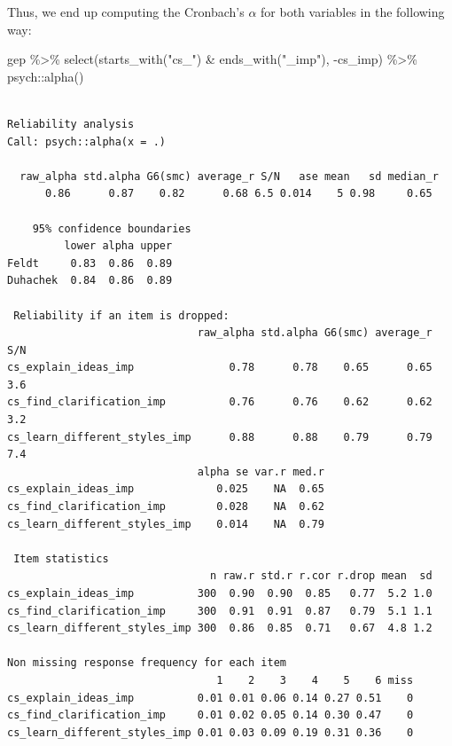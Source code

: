 \documentclass[
  letterpaper,
]{krantz}
\makeatletter
\newenvironment{Shaded}{\begin{snugshade}}{\end{snugshade}}
\newcommand{\FunctionTok}[1]{\textcolor[rgb]{0.28,0.35,0.67}{#1}}
\newcommand{\NormalTok}[1]{\textcolor[rgb]{0.00,0.23,0.31}{#1}}
\newcommand{\SpecialCharTok}[1]{\textcolor[rgb]{0.37,0.37,0.37}{#1}}
\newcommand{\StringTok}[1]{\textcolor[rgb]{0.13,0.47,0.30}{#1}}
\newenvironment{kframe}{%
\medskip{}
\setlength{\fboxsep}{.8em}
 \def\at@end@of@kframe{}%
 \ifinner\ifhmode%
  \def\at@end@of@kframe{\end{minipage}}%
  \begin{minipage}{\columnwidth}%
 \fi\fi%
 \def\FrameCommand##1{\hskip\@totalleftmargin \hskip-\fboxsep
 \colorbox{shadecolor}{##1}\hskip-\fboxsep
     \hskip-\linewidth \hskip-\@totalleftmargin \hskip\columnwidth}%
 \MakeFramed {\advance\hsize-\width
   \@totalleftmargin\z@ \linewidth\hsize
   \@setminipage}}%
 {\par\unskip\endMakeFramed%
 \at@end@of@kframe}
\renewenvironment{Shaded}{\begin{kframe}}{\end{kframe}}
\makeatother
\begin{document}
Thus, we end up computing the Cronbach's \(\alpha\) for both variables
in the following way:

\begin{Shaded}
\begin{Highlighting}[]
\NormalTok{gep }\SpecialCharTok{\%\textgreater{}\%}
  \FunctionTok{select}\NormalTok{(}\FunctionTok{starts\_with}\NormalTok{(}\StringTok{"cs\_"}\NormalTok{) }\SpecialCharTok{\&} \FunctionTok{ends\_with}\NormalTok{(}\StringTok{"\_imp"}\NormalTok{), }\SpecialCharTok{{-}}\NormalTok{cs\_imp) }\SpecialCharTok{\%\textgreater{}\%}
\NormalTok{  psych}\SpecialCharTok{::}\FunctionTok{alpha}\NormalTok{()}
\end{Highlighting}
\end{Shaded}

\begin{verbatim}

Reliability analysis   
Call: psych::alpha(x = .)

  raw_alpha std.alpha G6(smc) average_r S/N   ase mean   sd median_r
      0.86      0.87    0.82      0.68 6.5 0.014    5 0.98     0.65

    95% confidence boundaries 
         lower alpha upper
Feldt     0.83  0.86  0.89
Duhachek  0.84  0.86  0.89

 Reliability if an item is dropped:
                              raw_alpha std.alpha G6(smc) average_r S/N
cs_explain_ideas_imp               0.78      0.78    0.65      0.65 3.6
cs_find_clarification_imp          0.76      0.76    0.62      0.62 3.2
cs_learn_different_styles_imp      0.88      0.88    0.79      0.79 7.4
                              alpha se var.r med.r
cs_explain_ideas_imp             0.025    NA  0.65
cs_find_clarification_imp        0.028    NA  0.62
cs_learn_different_styles_imp    0.014    NA  0.79

 Item statistics 
                                n raw.r std.r r.cor r.drop mean  sd
cs_explain_ideas_imp          300  0.90  0.90  0.85   0.77  5.2 1.0
cs_find_clarification_imp     300  0.91  0.91  0.87   0.79  5.1 1.1
cs_learn_different_styles_imp 300  0.86  0.85  0.71   0.67  4.8 1.2

Non missing response frequency for each item
                                 1    2    3    4    5    6 miss
cs_explain_ideas_imp          0.01 0.01 0.06 0.14 0.27 0.51    0
cs_find_clarification_imp     0.01 0.02 0.05 0.14 0.30 0.47    0
cs_learn_different_styles_imp 0.01 0.03 0.09 0.19 0.31 0.36    0
\end{verbatim}
\end{document}
